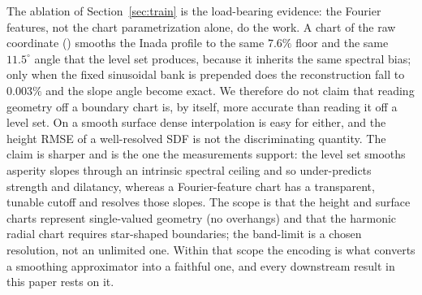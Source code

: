 The ablation of Section~\ref{sec:train} is the load-bearing evidence: the Fourier features, not the chart
parametrization alone, do the work. A chart of the raw coordinate () smooths the Inada
profile to the same $7.6\%$ floor and the same $11.5^\circ$ angle that the level set produces, because it
inherits the same spectral bias; only when the fixed sinusoidal bank is prepended does the reconstruction
fall to $0.003\%$ and the slope angle become exact. We therefore do not claim that reading geometry off a
boundary chart is, by itself, more accurate than reading it off a level set. On a smooth surface dense
interpolation is easy for either, and the height RMSE of a well-resolved SDF is not the discriminating
quantity. The claim is sharper and is the one the measurements support: the level set smooths asperity
slopes through an intrinsic spectral ceiling and so under-predicts strength and dilatancy, whereas a
Fourier-feature chart has a transparent, tunable cutoff and resolves those slopes. The scope is that
the height and surface charts represent single-valued geometry (no overhangs) and that the harmonic radial
chart requires star-shaped boundaries; the band-limit is a chosen resolution, not an unlimited one. Within
that scope the encoding is what converts a smoothing approximator into a faithful one, and every downstream
result in this paper rests on it.
